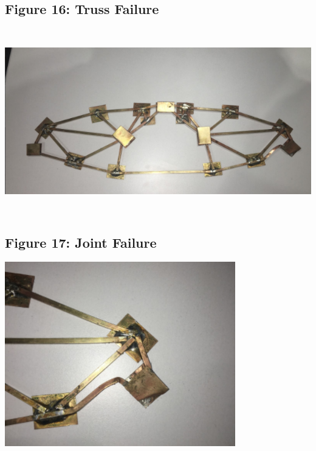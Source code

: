 \documentclass{article}
\begin{document}
\subsection{Figure 16: Truss Failure}
\begin{center}{\includegraphics[height=8cm]{BuckledTruss.png}}\end{center}

\subsection{Figure 17: Joint Failure}
\begin{center}{\includegraphics[height=8cm]{BuckledMember.png}}\end{center}
\end{document}
